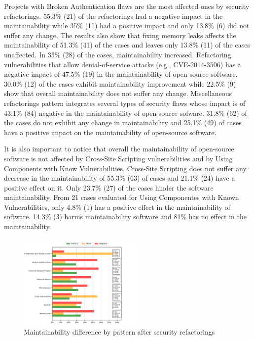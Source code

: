 \documentclass[10pt,conference]{IEEEtran}
\begin{document}
{Projects with Broken Authentication flaws are the most affected ones by security
refactorings. 55.3\% (21) of the refactorings had a negative impact in the maintainability
while 35\% (11) had a positive impact and only 13.8\% (6) did not suffer any
change. The results also show that fixing memory leaks affects the maintainability
of 51.3\% (41) of the cases and leaves only 13.8\% (11) of the cases unaffected.
In 35\% (28) of the cases, maintainability increased. Refactoring vulnerabilities
that allow denial-of-service attacks (e.g., CVE-2014-3506) has a negative impact
of 47.5\% (19) in the maintainability of open-source software. 30.0\% (12) of
the cases exhibit maintainability improvement while 22.5\% (9) show that overall
maintainability does not suffer any change. Miscellaneous refactorings pattern
integrates several types of security flaws whose impact is of 43.1\% (84) negative
in the maintainability of open-source sofware. 31.8\% (62) of the cases do not
exhibit any change in maintainability and 25.1\% (49) of cases have a positive
impact on the maintainability of open-source software.

It is also important to notice that overall the maintainability of open-source
software is not affected by Cross-Site Scripting vulnerabilities and by Using
Components with Know Vulnerabilities. Cross-Site Scripting does not suffer any
decrease in the maintainability of 55.3\% (63) of cases and 21.1\% (24) have a
positive effect on it. Only 23.7\% (27) of the cases hinder the software
maintainability. From 21 cases evaluated for Using Componentes with Known
Vulnerabilities, only 4.8\% (1) has a positive effect in the maintainability
of software. 14.3\% (3) harms maintainability software and 81\% has no effect
in the maintainability.

\begin{figure}[h]
 	\centering
 	\includegraphics[width=0.55\textwidth]{figures/category.pdf}
 	\caption{Maintainability difference by pattern after security refactorings}
	\label{fig:pat}
\end{figure}

}
\end{document}
